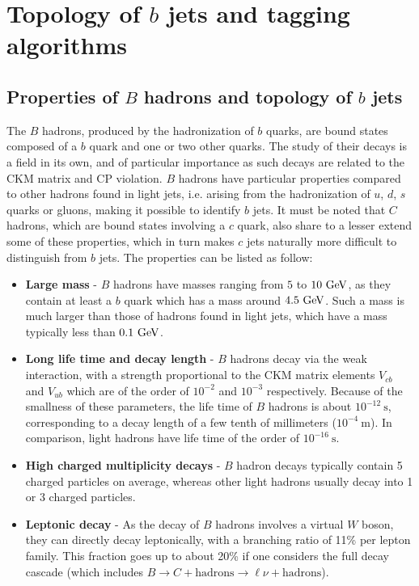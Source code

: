     \section{Topology of $b$ jets and tagging algorithms \label{sec:bTagAlgorithms}}

    \subsection{Properties of $B$ hadrons and topology of $b$ jets}

    The $B$ hadrons, produced by the hadronization of $b$ quarks, are bound states composed
    of a $b$ quark and one or two other quarks. The study of their decays is
    a field in its own, and of particular importance as such decays are related to the
    CKM matrix and CP violation. $B$ hadrons have particular properties compared to other hadrons
    found in light jets, i.e. arising from the hadronization of $u$, $d$, $s$ quarks or
    gluons, making it possible to identify $b$ jets. It must be noted that $C$ hadrons,
    which are bound states involving a $c$ quark, also share to a lesser extend some of these
    properties, which in turn makes $c$ jets naturally more difficult to distinguish
    from $b$ jets. The properties can be listed as follow:
    \begin{itemize}
        \item \textbf{Large mass} - $B$ hadrons have masses ranging from $5$ to $10~\text{GeV}$, as
              they contain at least a $b$ quark which has a mass around $4.5~\text{GeV}$. Such a mass is
              much larger than those of hadrons found in light jets, which have a mass
              typically less than $0.1~\text{GeV}$.
        \item \textbf{Long life time and decay length} - $B$ hadrons decay via the weak
              interaction, with a strength proportional to the CKM matrix elements $V_{cb}$ and $V_{ub}$
              which are of the order of $10^{-2}$ and $10^{-3}$ respectively. Because of
              the smallness of these parameters, the life time of $B$ hadrons is about
              $10^{-12}~\text{s}$, corresponding to a decay length of a few tenth of millimeters
              ($10^{-4}~\text{m}$). In comparison, light hadrons have life time of the order
              of $10^{-16}~\text{s}$.
        \item \textbf{High charged multiplicity decays} - $B$ hadron decays typically
              contain 5 charged particles on average, whereas other light hadrons
              usually decay into 1 or 3 charged particles.
        \item \textbf{Leptonic decay} - As the decay of $B$ hadrons involves a virtual $W$ boson,
              they can directly decay leptonically, with a branching ratio of
              11\% per lepton family. This fraction goes up to about 20\% if one
              considers the full decay cascade (which includes $B \rightarrow C +
              \text{hadrons} \rightarrow \ell\nu + \text{hadrons}$).
    \end{itemize}

